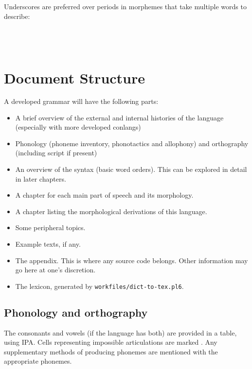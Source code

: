 \documentclass{book}
\begin{document}
Underscores are preferred over periods in morphemes that take multiple words to describe:
~\\
 \\
       \hlviii{$>$} \\
      \\

\chapter{Document Structure}

A developed grammar will have the following parts:

\begin{itemize}
  \item A brief overview of the external and internal histories of the language (especially with more developed conlangs)
  \item Phonology (phoneme inventory, phonotactics and allophony) and orthography (including script if present)
  \item An overview of the syntax (basic word orders). This can be explored in detail in later chapters.
  \item A chapter for each main part of speech and its morphology.
  \item A chapter listing the morphological derivations of this language.
  \item Some peripheral topics.
  \item Example texts, if any.
  \item The appendix. This is where any source code belongs. Other information may go here at one's discretion.
  \item The lexicon, generated by \texttt{workfiles/dict-to-tex.pl6}.
\end{itemize}

\section{Phonology and orthography}

The consonants and vowels (if the language has both) are provided in a table, using IPA. Cells representing impossible articulations are marked \texttt{}. Any supplementary methods of producing phonemes are mentioned with the appropriate phonemes.
\end{document}
